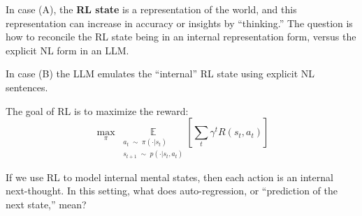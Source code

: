 In case (A), the \textbf{RL state} is a representation of the world, and this representation can increase in accuracy or insights by ``thinking.''  The question is how to reconcile the RL state being in an internal representation form, versus the explicit NL form in an LLM.  

In case (B) the LLM emulates the ``internal'' RL state using explicit NL sentences.

The goal of RL is to maximize the reward:
\begin{equation}
\max_{\pi} \; \underset{\substack{a_t \;\sim\; \pi(\cdot | s_t) \\ s_{t+1} \;\sim\; p(\cdot | s_t, a_t) }} {\mathbb{E}} \left[ \sum_{t} \gamma^t R(s_t, a_t) \right]
\end{equation}

If we use RL to model internal mental states, then each action is an internal next-thought.  In this setting, what does auto-regression, or ``prediction of the next state,'' mean?

